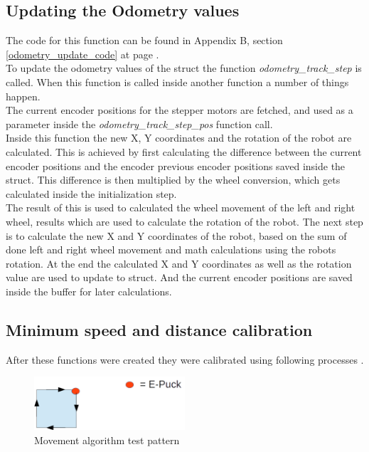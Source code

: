 \subsection{Updating the Odometry values}
\label{odometry_update_description}
The code for this function can be found in Appendix B, section \ref{odometry_update_code} at page \pageref{odometry_update_code}.\\
To update the odometry values of the struct the function \textit{odometry\_track\_step} is called.
When this function is called inside another function a number of things happen.\\
The current encoder positions for the stepper motors are fetched,
and used as a parameter inside the \textit{odometry\_track\_step\_pos} function call. \\
Inside this function the new X, Y coordinates and the rotation of the robot are calculated. This is achieved by first calculating the difference between the current encoder positions and the encoder previous encoder positions saved inside the struct.
This difference is then multiplied by the wheel conversion, which gets calculated inside the initialization step. \\
The result of this is used to calculated the wheel movement of the left and right wheel, results which are used to calculate the rotation of the robot.
The next step is to calculate the new X and Y coordinates of the robot, based on the sum of done left and right wheel movement  and math calculations using the robots rotation.
At the end the calculated X and Y coordinates as well as the rotation value are used to update to struct. And the current encoder positions are saved inside the buffer for later calculations.

\subsection{Minimum speed and distance calibration}
\label{mov_calibration}
After these functions were created they were calibrated using following processes .\\

\begin{figure}[h]
\centering
\includegraphics[width = 0.5\textwidth]{../../figures/movement_test.png}
\caption{Movement algorithm test pattern}
\label{movement_test}
\end{figure}

